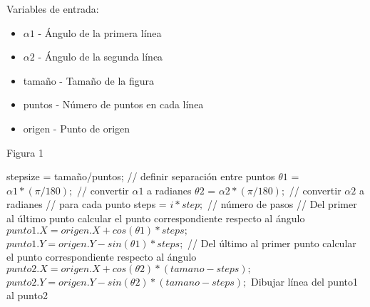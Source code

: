 \documentclass[letter,10pt]{article}
\begin{document}
 

Variables de entrada:
\begin{itemize}
	\item  $\alpha 1$ - Ángulo de la primera línea
	\item  $\alpha 2$ - Ángulo de la segunda línea
	\item  tamaño - Tamaño de la figura
	\item  puntos - Número de puntos en cada línea
	\item  origen - Punto de origen
\end{itemize}

\begin{algorithm}
	\caption{Figura 1} 
	\begin{algorithmic}[1]
		\State stepsize = tamaño/puntos; // definir separación entre puntos
		\State $\theta 1$ = $\alpha 1*(\pi/180);$ // convertir $\alpha 1$ a radianes
		\State $\theta 2$ = $\alpha 2*(\pi/180);$ // convertir $\alpha 2$ a radianes
		 // para cada punto
			\State steps = $i*step;$ // número de pasos
			\State // Del primer al último punto calcular el punto correspondiente respecto al ángulo
			\State $punto1.X= origen.X+cos(\theta 1)*steps; $
			\State $punto1.Y= origen.Y-sin(\theta 1)*steps; $
			\State // Del último al primer punto calcular el punto correspondiente respecto al ángulo
			\State $punto2.X= origen.X+cos(\theta 2)*(tamano-steps); $
			\State $punto2.Y= origen.Y-sin(\theta 2)*(tamano-steps); $
			\State Dibujar línea del punto1 al punto2
		\EndFor
	\end{algorithmic} 
\end{algorithm}
\end{document}
